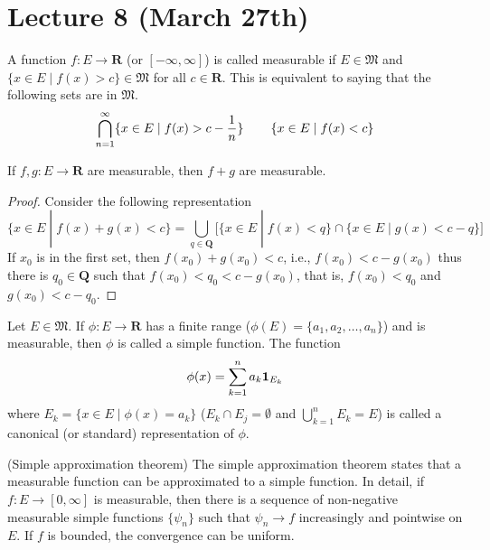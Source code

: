 \section{Lecture 8 (March 27th)}
\begin{recall}
A function $f:E\rightarrow {\bm R}$ (or $[-\infty ,\infty ]$) is called measurable if $E\in \mathfrak{M}$ and $\{x\in E \;|\; f(x)>c\}\in \mathfrak{M}$ for all $c\in {\bm R}$. This is equivalent to saying that the following sets are in $\mathfrak{M}$.
\[\bigcap ^{\infty }_{n=1}\{x\in E \;|\; f(x)>c-\dfrac{1}{n}\}\hspace{5ex}\{x\in E \;|\; f(x)<c\}\]
\end{recall}
\vspace{2ex}
\begin{thm}
If $f,g:E\rightarrow {\bm R}$ are measurable, then $f+g$ are measurable.
\end{thm}
\vspace{2ex}
\begin{proof}
Consider the following representation
\[\{x\in E \;|\; f(x)+g(x)<c\}=\bigcup _{q\in {\bm Q}}\Big[\{x\in E \;|\; f(x)<q\}\cap \{x\in E \;|\; g(x)<c-q\}\Big]\]
If $x_0$ is in the first set, then $f(x_0)+g(x_0)<c$, i.e., $f(x_0)<c-g(x_0)$ thus there is $q_0\in {\bm Q}$ such that $f(x_0)<q_0<c-g(x_0)$, that is, $f(x_0)<q_0$ and $g(x_0)<c-q_0$.
\end{proof}
\vspace{2ex}
\begin{rmk}
Let $E\in \mathfrak{M}$. If $\phi :E\rightarrow {\bm R}$ has a finite range ($\phi (E)=\{a_1,a_2,\ldots ,a_{n}\}$) and is measurable, then $\phi $ is called a simple function. The function
\[\phi (x)=\sum ^{n}_{k=1}a_{k}{\bf 1} _{E_{k}}\]
where $E_{k}=\{x\in E \;|\; \phi (x)=a_{k}\}$ ($E_{k}\cap E_{j}=\emptyset$ and $\bigcup ^{n}_{k=1}E_{k}=E$) is called a canonical (or standard) representation of $\phi $. 
\end{rmk}
\vspace{2ex}
\begin{thm}
(Simple approximation theorem) The simple approximation theorem states that a measurable function can be approximated to a simple function. In detail, if $f:E\rightarrow [0,\infty ]$ is measurable, then there is a sequence of non-negative measurable simple functions $\{\psi _{n}\}$ such that $\psi _{n}\rightarrow f$ increasingly and pointwise on $E$. If $f$ is bounded, the convergence can be uniform.
\end{thm}
\vspace{2ex}
